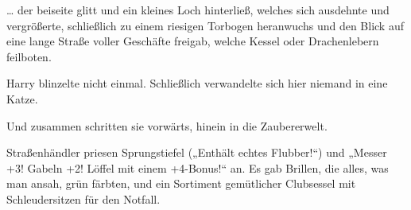… der beiseite glitt und ein kleines Loch hinterließ, welches sich ausdehnte und vergrößerte, schließlich zu einem riesigen Torbogen heranwuchs und den Blick auf eine lange Straße voller Geschäfte freigab, welche Kessel oder Drachenlebern feilboten.

Harry blinzelte nicht einmal. Schließlich verwandelte sich hier niemand in eine Katze.

Und zusammen schritten sie vorwärts, hinein in die Zaubererwelt.

Straßenhändler priesen Sprungstiefel („Enthält echtes Flubber!“) und
„Messer +3! Gabeln +2! Löffel mit einem +4-Bonus!“ an. Es gab Brillen, die alles, was man ansah, grün färbten, und ein Sortiment gemütlicher Clubsessel mit Schleudersitzen für den Notfall.

